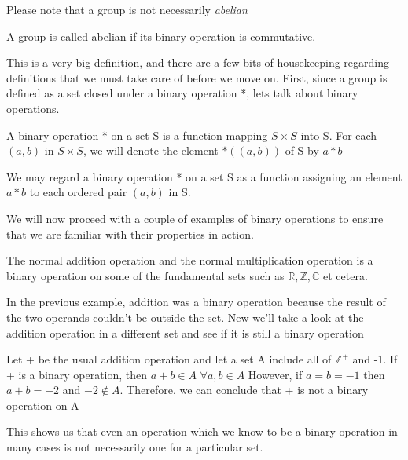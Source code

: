 Please note that a group is not necessarily \emph{abelian}

\begin{definition}
	A group is called abelian if its binary operation is commutative.
\end{definition}

This is a very big definition, and there are a few bits of housekeeping regarding definitions that we must take care of before we move on. First, since a group is defined as a set closed under a binary operation *, lets talk about binary operations.

\begin{definition}
A binary operation * on a set S is a function mapping $S \times S$ into S. \newline
For each $(a,b)$ in $S \times S$, we will denote the element $*((a,b))$ of S by $a*b$ 
\end{definition}

We may regard a binary operation * on a set S as a function assigning an element $a*b$ to each ordered pair $(a,b)$ in S. \newline

We will now proceed with a couple of examples of binary operations to ensure that we are familiar with their properties in action.

\begin{example}
The normal addition operation and the normal multiplication operation is a binary operation on some of the fundamental sets such as $\mathbb{R},\mathbb{Z},\mathbb{C}$ et cetera.
\end{example}

In the previous example, addition was a binary operation because the result of the two operands couldn't be outside the set. New we'll take a look at the addition operation in a different set and see if it is still a binary operation

\begin{example}
Let + be the usual addition operation and let a set A include all of $\mathbb{Z}^+$ and -1. \newline
If + is a binary operation, then $a+b \in A$  $\forall a,b \in A$ \newline
However, if $a=b=-1$ then $a+b = -2$ and $-2 \notin A.$ \newline
Therefore, we can conclude that + is not a binary operation on A
\end{example}

This shows us that even an operation which we know to be a binary operation in many cases is not necessarily one for a particular set.

